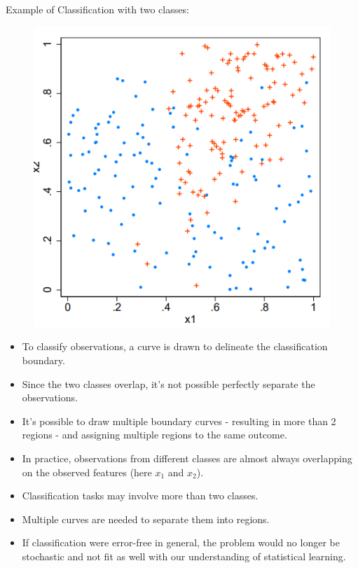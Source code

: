 \documentclass[12pt, oneside]{article}
\begin{document}
Example of Classification with two classes:
\begin{figure}[!ht]
    \centering
    \includegraphics[width=\textwidth]{Classification with two classes.png}        
    \label{fig:my_label}
\end{figure}
\begin{itemize}
    \item To classify observations, a curve is drawn to delineate the classification boundary.
    \item  Since the two classes overlap, it's not possible perfectly separate the observations.
    \item It's possible to draw multiple boundary curves - resulting in more than 2 regions - and assigning multiple regions to the same outcome.
    \item In practice, observations from different classes are almost always overlapping on the observed features (here $x_1$ and $x_2$).
\end{itemize}

\begin{itemize}
    \item Classification tasks may involve more than two classes.
    \item Multiple curves are needed to separate them into regions.
    \item If classification were error-free in general, the problem would no longer be stochastic and not fit as well with our understanding of statistical learning.
\end{itemize}
\end{document}
